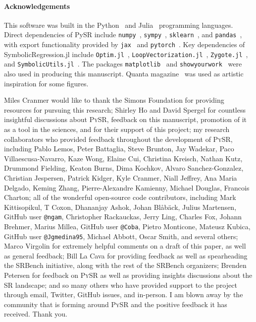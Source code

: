 \documentclass[letterpaper,twocolumn]{scrartcl}
\newcommand\pysr{\textsc{PySR}\xspace}
\begin{document}
\paragraph{Acknowledgements}
This software was built in the Python~\cite{vanrossumPythonReferenceManual2009} and Julia~\cite{julia} programming languages.
Direct dependencies of PySR include
\texttt{numpy}~\cite{numpy},
\texttt{sympy}~\cite{sympy},
\texttt{sklearn}~\cite{sklearn},
and
\texttt{pandas}~\cite{pandas},
with export functionality provided by
\texttt{jax}~\cite{jax}
and
\texttt{pytorch}~\cite{torch}.
Key dependencies of SymbolicRegression.jl include
\texttt{Optim.jl}~\cite{mogensenOptimMathematicalOptimization2018}, \texttt{LoopVectorization.jl}~\cite{elrodLoopVectorizationJlMacro2022}, \texttt{Zygote.jl}~\cite{innesDonUnrollAdjoint2018}, and
\texttt{SymbolicUtils.jl}~\cite{gowdaHighperformanceSymbolicnumericsMultiple2022}.
The packages \texttt{matplotlib}~\cite{matplotlib} and
\texttt{showyourwork}~\cite{lugerShowyourwork2021}
were also used in producing this manuscript.
Quanta magazine~\cite{woodPowerfulMachineScientists2022} was used as artistic inspiration for some figures.

Miles Cranmer would like to thank
the Simons Foundation for providing resources for pursuing this research;
Shirley Ho and David Spergel for countless insightful discussions about \pysr, feedback on this manuscript, promotion of it as a tool in the sciences, and for their support of this project;
my research collaborators who provided feedback throughout the development of \pysr, including Pablo Lemos, Peter Battaglia, Steve Brunton, Jay Wadekar, Paco Villaescusa-Navarro, Kaze Wong, Elaine Cui, Christina Kreisch, Nathan Kutz, Drummond Fielding, Keaton Burns, Dima Kochkov, Alvaro Sanchez-Gonzalez, Christian Jespersen, Patrick Kidger, Kyle Cranmer, Niall Jeffrey, Ana Maria Delgado, Keming Zhang, Pierre-Alexandre Kamienny, Michael Douglas, Francois Charton;
all of the wonderful open-source code contributors, including Mark Kittisopikul, T Coxon, Dhananjay Ashok, Johan Blåbäck, Julius Martensen, GitHub user \texttt{@ngam}, Christopher Rackauckas, Jerry Ling, Charles Fox, Johann Brehmer, Marius Millea, GitHub user \texttt{@Coba}, Pietro Monticone, Mateusz Kubica, GitHub user \texttt{@Jgmedina95}, Michael Abbott, Oscar Smith, and several others;
Marco Virgolin for extremely helpful comments on a draft of this paper, as well as general feedback;
Bill La Cava for providing feedback as well as spearheading the SRBench initiative, along with the rest of the SRBench organizers;
Brenden Petersen for feedback on \pysr as well as providing insights discussions about the SR landscape;
and so many others who have provided support to the project through email, Twitter, GitHub issues, and in-person.
I am blown away by the community that is forming around \pysr and the positive feedback it has received. Thank you.





\end{document}

